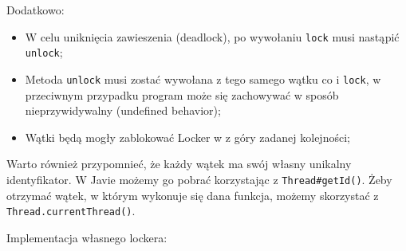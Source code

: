 \documentclass[11pt]{article}
\providecommand{\tightlist}{%
      \setlength{\itemsep}{0pt}\setlength{\parskip}{0pt}}
\begin{document}
Dodatkowo:

\begin{itemize}
\tightlist
\item
  W celu uniknięcia zawieszenia (deadlock), po wywołaniu \texttt{lock}
  musi nastąpić \texttt{unlock};
\item
  Metoda \texttt{unlock} musi zostać wywołana z tego samego wątku co i
  \texttt{lock}, w przeciwnym przypadku program może się zachowywać w
  sposób nieprzywidywalny (undefined behavior);
\item
  Wątki będą mogły zablokować Locker w z góry zadanej kolejności;
\end{itemize}

Warto również przypomnieć, że każdy wątek ma swój własny unikalny
identyfikator. W Javie możemy go pobrać korzystając z
\texttt{Thread\#getId()}. Żeby otrzymać wątek, w którym wykonuje się
dana funkcja, możemy skorzystać z \texttt{Thread.currentThread()}.

Implementacja własnego lockera:
\end{document}

